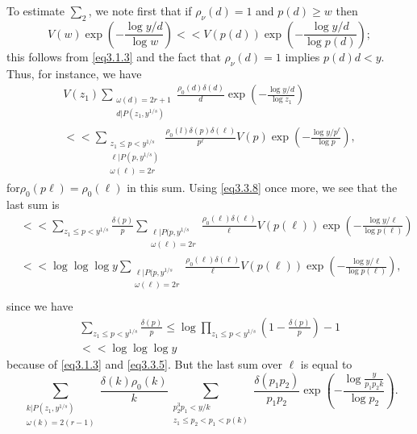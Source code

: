 To estimate $\sum_2$, we note first that if $\rho_\nu (d)=1$ and $p(d)
\ge w$ then 
\begin{equation*}
  V(w) \exp\left(-\frac{\log y/d}{\log w}\right) << V(p(d)) 
  \exp\left(-\frac{\log y/d}{\log p(d)}\right); \tag{3.3.8} \label{eq3.3.8}
\end{equation*}
this follows from \eqref{eq3.1.3} and the fact that $\rho_\nu (d)=1$ implies
$p(d) d < y$. Thus, for instance, we have 
\begin{multline*}
  V(z_1)\sum_{\substack {\omega(d)=2r+1 \\ { d| P(z_1,y^{1/s})}}}
  \frac{\rho_0(d)\delta (d)}{d} \exp\left(-\frac{\log y/d}{\log z_1}\right)\\ 
  << \sum_{\substack{z_1 \le p<y^{1/s}\\{\ell |P(p,y^{1/s})} \\{\omega
        (\ell)=2r}}} \frac{\rho_0(l) \delta(p)
    \delta(\ell)}{p^\ell}V(p) \exp\left(-\frac{\log y/p^\ell}{\log
    p}\right),\tag{3.3.9} \label{eq3.3.9}
\end{multline*}
for\pageoriginale $\rho_0(p \ell)=\rho_0(\ell)$ in this sum. Using
\eqref{eq3.3.8} once more, we see that the last sum is  
\begin{align*}
  & << \sum_{z_1 \le p<y^{1/s}} \frac{\delta(p)}{p} \sum_{\substack
    {\ell |P(p,y^{1/s}\\{\omega(\ell)=2r}}} 
  \frac{\rho_0(\ell)\delta(\ell)}{\ell}V(p(\ell))
  \exp\left(-\frac{\log y/\ell}{\log p(\ell)}\right)\\ 
  & << \log \log \log y \sum_{\substack {\ell
      |P(p, y^{1/s}\\{\omega(\ell)=2r}}} 
  \frac{\rho_0(\ell)\delta(\ell)}{\ell}V(p(\ell))
  \exp\left(-\frac{\log y/\ell}{\log p(\ell)}\right),\\ 
\end{align*}
since we have
\begin{gather*}
  \sum_{z_1 \le p<y^{1/s}} \frac{\delta(p)}{p} \le \log \prod_{z_1 \le p
    < y^{1/s}}\left(1- \frac{\delta(p)}{p}\right)-1\\ 
  << \log \log \log y
\end{gather*}
because of \eqref{eq3.1.3} and \eqref{eq3.3.5}. But the last sum over
$\ell$ is equal to 
$$
   \sum_{\substack{k|P(z_1,y^{1/s})\\{\omega(k)=2(r-1)}}}
   \frac{\delta(k)\rho_0(k)}{k}\sum_{\substack{p^3_2p_1<y/k\\{z_1 \le
         p_2 <p_1 <p(k)}}} \frac{\delta(p_1 p_2)}{p_1 p_2}
   \exp\left(-\frac{\log \frac{y}{p_1 p_2 k}}{\log p_2}\right). 
$$ 

